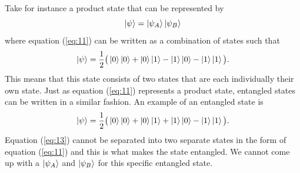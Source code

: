 \documentclass[twocolumn]{article}
\begin{document}
Take for instance a product state that can be represented by
\begin{equation}\label{eq:11}
\ket{\psi}=\ket{\psi_A}\ket{\psi_B}
\end{equation}
where equation (\ref{eq:11}) can be written as a combination of states such that
\begin{equation}\label{eq:12}
\ket{\psi}=\frac{1}{2}\big(\ket{0}\ket{0}+\ket{0}\ket{1}-\ket{1}\ket{0}-\ket{1}\ket{1}\big).
\end{equation}
This means that this state consists of two states that are each individually their own state. Just as equation (\ref{eq:11}) represents a product state, entangled states can be written in a similar fashion. An example of an entangled state is
\begin{equation}\label{eq:13}
\ket{\psi}=\frac{1}{2}\big(\ket{0}\ket{0}+\ket{0}\ket{1}+\ket{1}\ket{0}-\ket{1}\ket{1}\big).
\end{equation}
Equation (\ref{eq:13}) cannot be separated into two separate states in the form of equation (\ref{eq:11}) and this is what makes the state entangled. We cannot come up with a $\ket{\psi_A}$ and $\ket{\psi_B}$ for this specific entangled state.
\end{document}
